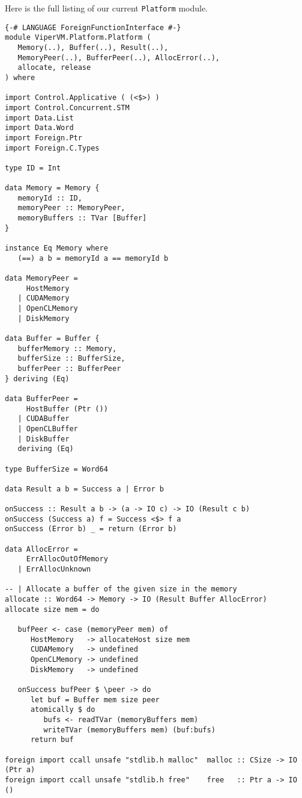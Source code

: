 Here is the full listing of our current \texttt{Platform} module.

\begin{lstlisting}
{-# LANGUAGE ForeignFunctionInterface #-}
module ViperVM.Platform.Platform (
   Memory(..), Buffer(..), Result(..),
   MemoryPeer(..), BufferPeer(..), AllocError(..),
   allocate, release
) where

import Control.Applicative ( (<$>) )
import Control.Concurrent.STM
import Data.List
import Data.Word
import Foreign.Ptr
import Foreign.C.Types

type ID = Int

data Memory = Memory {
   memoryId :: ID,
   memoryPeer :: MemoryPeer,
   memoryBuffers :: TVar [Buffer]
}

instance Eq Memory where
   (==) a b = memoryId a == memoryId b

data MemoryPeer =
     HostMemory
   | CUDAMemory
   | OpenCLMemory
   | DiskMemory

data Buffer = Buffer {
   bufferMemory :: Memory,
   bufferSize :: BufferSize,
   bufferPeer :: BufferPeer
} deriving (Eq)

data BufferPeer = 
     HostBuffer (Ptr ())
   | CUDABuffer
   | OpenCLBuffer
   | DiskBuffer
   deriving (Eq)

type BufferSize = Word64

data Result a b = Success a | Error b

onSuccess :: Result a b -> (a -> IO c) -> IO (Result c b)
onSuccess (Success a) f = Success <$> f a
onSuccess (Error b) _ = return (Error b)

data AllocError = 
     ErrAllocOutOfMemory
   | ErrAllocUnknown

-- | Allocate a buffer of the given size in the memory 
allocate :: Word64 -> Memory -> IO (Result Buffer AllocError)
allocate size mem = do

   bufPeer <- case (memoryPeer mem) of
      HostMemory   -> allocateHost size mem
      CUDAMemory   -> undefined
      OpenCLMemory -> undefined
      DiskMemory   -> undefined

   onSuccess bufPeer $ \peer -> do
      let buf = Buffer mem size peer
      atomically $ do
         bufs <- readTVar (memoryBuffers mem)
         writeTVar (memoryBuffers mem) (buf:bufs)
      return buf

foreign import ccall unsafe "stdlib.h malloc"  malloc :: CSize -> IO (Ptr a)
foreign import ccall unsafe "stdlib.h free"    free   :: Ptr a -> IO ()


\end{lstlisting}
